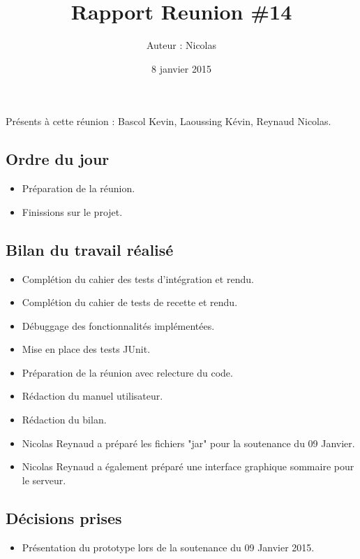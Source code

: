 \documentclass[12pt,a4paper]{article}
\title{Rapport Reunion \#14}
\author{Auteur : Nicolas \bsc{REYNAUD}}
\date{8 janvier 2015}
\begin{document}
\maketitle

\newpage

Présents à cette réunion : Bascol Kevin, Laoussing Kévin, Reynaud Nicolas.

\subsection*{Ordre du jour}
\begin{itemize}[label = $\blacktriangleright$]
\item Préparation de la réunion.
\item Finissions sur le projet.
\end{itemize}

\subsection*{Bilan du travail réalisé}

\begin{itemize}[label = $\blacktriangleright$]
\item Complétion du cahier des tests d'intégration et rendu.

\item Complétion du cahier de tests de recette et rendu.

\item Débuggage des fonctionnalités implémentées.

\item Mise en place des tests JUnit.

\item Préparation de la réunion avec relecture du code.

\item Rédaction du manuel utilisateur.

\item Rédaction du bilan.

\item Nicolas Reynaud a préparé les fichiers "jar" pour la soutenance du 09 Janvier.

\item Nicolas Reynaud a également préparé une interface graphique sommaire pour le serveur.

\end{itemize}


\subsection*{Décisions prises}

\begin{itemize}[label = $\blacktriangleright$] 
\item Présentation du prototype lors de la soutenance du 09 Janvier 2015.
\end{itemize}
\end{document}
